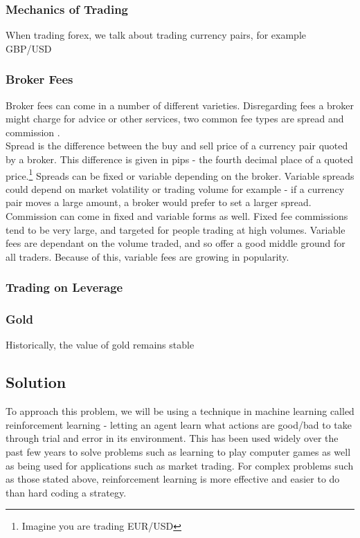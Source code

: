             \subsubsection{Mechanics of Trading}
            When trading forex, we talk about trading currency pairs, for example GBP/USD


            \subsubsection{Broker Fees}
            
            Broker fees can come in a number of different varieties. Disregarding fees a broker might charge for advice or other services, two common fee types are spread and commission \cite{tradimo_cost}.\\
            
            Spread is the difference between the buy and sell price of a currency pair quoted by a broker. This difference is given in pips - the fourth decimal place of a quoted price.\footnote{Imagine you are trading EUR/USD} Spreads can be fixed or variable depending on the broker. Variable spreads could depend on market volatility or trading volume for example - if a currency pair moves a large amount, a broker would prefer to set a larger spread. \\

            Commission can come in fixed and variable forms as well. Fixed fee commissions tend to be very large, and targeted for people trading at high volumes. Variable fees are dependant on the volume traded, and so offer a good middle ground for all traders. Because of this, variable fees are growing in popularity. \cite{llc_2016} 


            \subsubsection{Trading on Leverage}


            \subsubsection{Gold}

            Historically, the value of gold remains stable 



    \subsection{Solution} To approach this problem, we will be using a technique in machine learning called reinforcement learning - letting an agent learn what actions are good/bad to take through trial and error in its environment. This has been used widely over the past few years to solve problems such as learning to play computer games as well as being used for applications such as market trading. For complex problems such as those stated above, reinforcement learning is more effective and easier to do than hard coding a strategy. 

